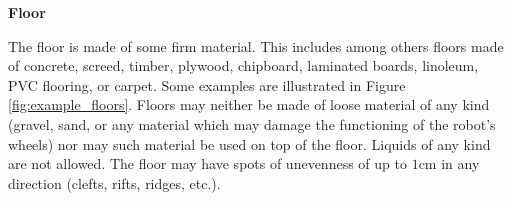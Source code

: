 \textbf{Floor}

The floor is made of some firm material. This includes among others floors made of concrete, screed, timber, plywood, chipboard, laminated boards, linoleum, PVC flooring, or carpet. Some examples are illustrated in Figure \ref{fig:example_floors}. Floors may neither be made of loose material of any kind (gravel, sand, or any material which may damage the functioning of the robot's wheels) nor may such material be used on top of the floor. Liquids of any kind are not allowed. The floor may have spots of unevenness of up to $1\si{\centi\meter}$ in any direction (clefts, rifts, ridges, etc.).


\begin{figure} [h!]
	\begin{center}
		 \hspace{0.1cm}
		 \hspace{0.1cm}
		 \hspace{0.1cm}
		 \hspace{0.1cm}
		\\

\end{center}
\end{figure}
